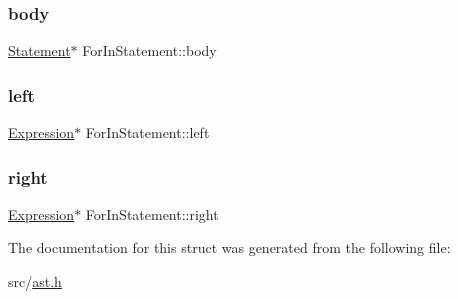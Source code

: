 \subsubsection{\texorpdfstring{body}{body}}
{\footnotesize\ttfamily \hyperlink{struct_statement}{Statement}$\ast$ For\+In\+Statement\+::body}

\mbox{\label{struct_for_in_statement_acb865c777a9c3ccbe84ed09532f1a22f}} 
\subsubsection{\texorpdfstring{left}{left}}
{\footnotesize\ttfamily \hyperlink{struct_expression}{Expression}$\ast$ For\+In\+Statement\+::left}

\mbox{\label{struct_for_in_statement_a8aec27cbc19e2cb038acd3d0fc0a1969}} 
\subsubsection{\texorpdfstring{right}{right}}
{\footnotesize\ttfamily \hyperlink{struct_expression}{Expression}$\ast$ For\+In\+Statement\+::right}



The documentation for this struct was generated from the following file\+:\begin{DoxyCompactItemize}
\item 
src/\hyperlink{ast_8h}{ast.\+h}\end{DoxyCompactItemize}
